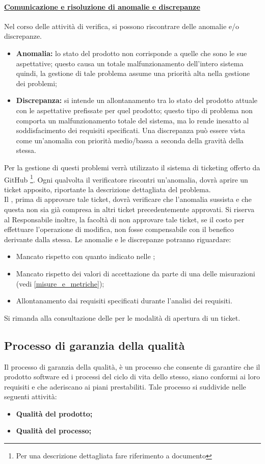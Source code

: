 \paragraph{\underline{Comunicazione e risoluzione di anomalie e discrepanze}}
Nel corso delle attività di verifica, si possono riscontrare delle anomalie e/o discrepanze.
\begin{itemize}
	\item \textbf{Anomalia:} lo stato del prodotto non corrisponde a quelle che sono le sue aspettative; questo causa un totale malfunzionamento dell'intero sistema quindi, la gestione di tale problema assume una priorità alta nella gestione dei problemi;
	\item \textbf{Discrepanza:} si intende un allontanamento tra lo stato del prodotto attuale con le aspettative prefissate per quel prodotto; questo tipo di problema non comporta un malfunzionamento totale del sistema, ma lo rende inesatto al soddisfacimento dei requisiti specificati. Una discrepanza può essere vista come un'anomalia con priorità medio/bassa a seconda della gravità della stessa.
\end{itemize}
Per la gestione di questi problemi verrà utilizzato il sistema di ticketing offerto da GitHub\glossario{} \footnote{Per una descrizione dettagliata fare riferimento a documento \NdP}. Ogni qualvolta il verificatore riscontri un'anomalia, dovrà aprire un ticket apposito, riportante la descrizione dettagliata del problema. 
\\Il \projectManager{}, prima di approvare tale ticket, dovrà verificare che l'anomalia sussista e che questa non sia già compresa in altri ticket precedentemente approvati. Si riserva al Responsabile inoltre, la facoltà di non approvare tale ticket, se il costo per effettuare l'operazione di modifica, non fosse compensabile con il benefico derivante dalla stessa.
Le anomalie e le discrepanze potranno riguardare:
\begin{itemize}
	\item Mancato rispetto con quanto indicato nelle \NdP;
	\item Mancato rispetto dei valori di accettazione da parte di una delle misurazioni (vedi \ref{misure_e_metriche});
	\item Allontanamento dai requisiti specificati durante l'analisi dei requisiti.
\end{itemize}
Si rimanda alla consultazione delle \NdP\space per le modalità di apertura di un ticket.

\subsection{Processo di garanzia della qualità}
\label{processoqualità}
Il processo di garanzia della qualità, è un processo che consente di garantire che il prodotto software ed i processi del ciclo di vita dello stesso, siano conformi ai loro requisiti e che aderiscano ai piani prestabiliti.
Tale processo si suddivide nelle seguenti attività:
\begin{itemize}
\item \textbf{Qualità del prodotto;}
\item \textbf{Qualità del processo;}
\end{itemize}

